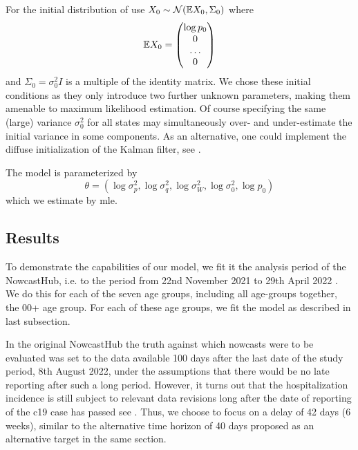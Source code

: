 For the initial distribution of use $X_{0} \sim \mathcal N(\mathbb E X_{0}, \Sigma_0)$ where 
$$
    \mathbb E X_{0} = \begin{pmatrix}
        \log p_{0} \\
        0 \\
        \dots \\
        0
    \end{pmatrix}
$$
and $\Sigma_{0} = \sigma^{2}_0 I$ is a multiple of the identity matrix. We chose these initial conditions as they only introduce two further unknown parameters, making them amenable to maximum likelihood estimation. Of course specifying the same (large) variance $\sigma^{2}_0$ for all states may simultaneously over- and under-estimate the initial variance in some components. As an alternative, one could implement the diffuse initialization of the Kalman filter, see \citep{Ansley1985Estimation,Koopman1997Exact}.

The model is parameterized by 
$$
    \theta = \left( \log \sigma^{2}_{p}, \log \sigma_{q}^{2}, \log \sigma^{2}_W, \log \sigma^{2}_0, \log p_{0} \right)
$$
which we estimate by \acrshort{mle}. 





\subsection{Results}

To demonstrate the capabilities of our model, we fit it the analysis period of the NowcastHub, i.e. to the period from 22nd November 2021 to 29th April 2022 \citep{Wolffram2023Collaborative}. We do this for each of the seven age groups, including all age-groups together, the 00+ age group. 
For each of these age groups, we fit the model as described in last subsection. 

In the original NowcastHub the truth against which nowcasts were to be evaluated was set to the data available 100 days after the last date of the study period, 8th August 2022, under the assumptions that there would be no late reporting after such a long period. However, it turns out that the hospitalization incidence is still subject to relevant data revisions long after the date of reporting of the \acrshort{c19} case has passed see \citep[Section 3.7]{Wolffram2023Collaborative}. Thus, we choose to focus on a delay of 42 days (6 weeks), similar to the alternative time horizon of 40 days proposed as an alternative target in the same section. 

